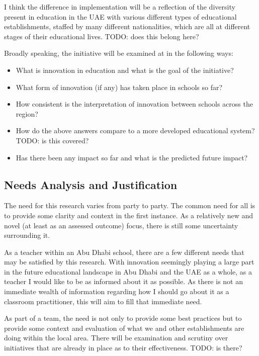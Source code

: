 I think the difference in implementation will be a reflection of the diversity present in education in the UAE with various different types of educational establishments, staffed by many different nationalities, which are all at different stages of their educational lives. TODO: does this belong here?

Broadly speaking, the initiative will be examined at in the following ways: 

\begin{itemize}
\item What is innovation in education and what is the goal of the initiative?
\item What form of innovation (if any) has taken place in schools so far?
\item How consistent is the interpretation of innovation between schools across the region?
\item How do the above answers compare to a more developed educational system? TODO: is this covered?
\item Has there been any impact so far and what is the predicted future impact?
\end{itemize}

\subsection{Needs Analysis and Justification}

The need for this research varies from party to party. The common need for  all is to provide some clarity and context in the first instance. As a relatively new and novel (at least as an assessed outcome) focus, there is still some uncertainty surrounding it.

As a teacher within an Abu Dhabi school, there are a few different needs that may be satisfied by this research. With innovation seemingly playing a large part in the future educational landscape in Abu Dhabi and the UAE as a whole, as a teacher I would like to be as informed about it as possible. As there is not an immediate wealth of information regarding how I should go about it as a classroom practitioner, this will aim to fill that immediate need.

As part of a team, the need is not only to provide some best practices but to provide some context and evaluation of what we and other establishments are doing within the local area. There will be examination and scrutiny over initiatives that are already in place as to their effectiveness. TODO: is there?

